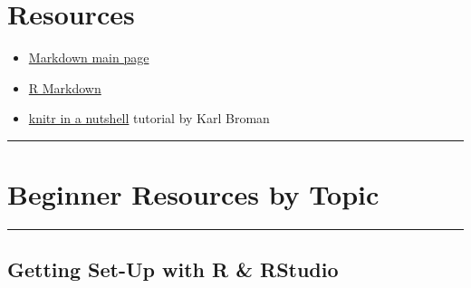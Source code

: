 \documentclass[]{book}
\providecommand{\tightlist}{%
  \setlength{\itemsep}{0pt}\setlength{\parskip}{0pt}}
\begin{document}
\hypertarget{resources}{%
\section{Resources}\label{resources}}

\begin{itemize}
\tightlist
\item
  \href{http://daringfireball.net/projects/markdown/}{Markdown main page}
\item
  \href{http://rmarkdown.rstudio.com/}{R Markdown}
\item
  \href{http://kbroman.org/knitr_knutshell/}{knitr in a nutshell} tutorial by Karl Broman
\end{itemize}

\begin{center}\rule{0.5\linewidth}{0.5pt}\end{center}

\hypertarget{beginner-resources-by-topic}{%
\section{Beginner Resources by Topic}\label{beginner-resources-by-topic}}

\begin{center}\rule{0.5\linewidth}{0.5pt}\end{center}

\hypertarget{getting-set-up-with-r-rstudio}{%
\subsection{Getting Set-Up with R \& RStudio}\label{getting-set-up-with-r-rstudio}}
\end{document}
